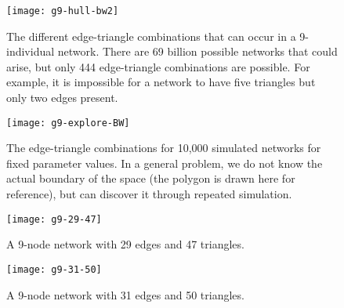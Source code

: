\documentclass[12pt]{article}
\begin{document}
\newpage
\begin{figure}[ht!]
\centering
\texttt{[image: g9-hull-bw2]}
\caption{The different edge-triangle combinations that can occur in a 9-individual network.  
There are 69 billion possible networks that could arise, but only 444 edge-triangle 
combinations are possible.  For example, it is impossible for a network to have five 
triangles but only two edges present.}
\label{F:g9-hull}

\texttt{[image: g9-explore-BW]}
\caption{The edge-triangle combinations for 10,000 simulated networks for fixed
parameter values.  In a general problem, we do not know the actual boundary of the 
space (the polygon is drawn here for reference), but can discover it through repeated simulation.}
\label{F:g9-sample}
\end{figure}

\newpage
\begin{figure}[ht!]
\centering
\texttt{[image: g9-29-47]}
\caption{A 9-node network with 29 edges and 47 triangles.}
\label{F:g9-29-47}

\texttt{[image: g9-31-50]}
\caption{A 9-node network with 31 edges and 50 triangles.}
\label{F:g9-31-50}
\end{figure}

\newpage
%




%

%


%

% 
\end{document}
